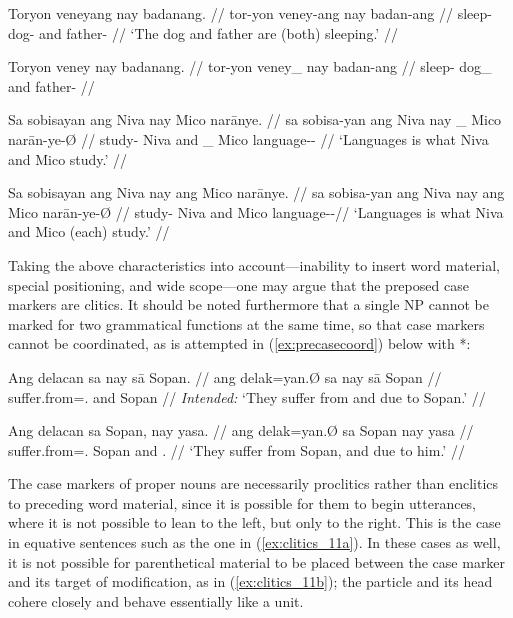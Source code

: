 \pex\label{ex:clitics_7}
\a\label{ex:clitics_7a}\begingl
	\gla Toryon veneyang nay badanang. //
	\glb tor-yon veney-ang nay badan-ang //
	\glc sleep-\TplN{} dog-\Aarg{} and father-\Aarg{} //
	\glft `The dog and father are (both) sleeping.' //
\endgl

\a\label{ex:clitics_7b}\ljudge{*}\begingl
	\gla Toryon veney nay badanang. //
	\glb tor-yon veney\_ nay badan-ang //
	\glc sleep-\TplN{} dog\_ and father-\Aarg{} //
\endgl

\a\label{ex:clitics_7c}\begingl
	\gla Sa sobisayan ang Niva nay {} Mico narānye. //
	\glb sa sobisa-yan ang Niva nay \_ Mico narān-ye-Ø //
	\glc \PatT{} study-\TplM{} \Aarg{} Niva and \_ Mico 
		language-\Pl{}-\Top{} //
	\glft `Languages is what Niva and Mico study.' //
\endgl

\a\label{ex:clitics_7d}\begingl
	\gla Sa sobisayan ang Niva nay ang Mico narānye. //
	\glb sa sobisa-yan ang Niva nay ang Mico narān-ye-Ø //
	\glc \PatT{} study-\TplM{} \Aarg{} Niva and \Aarg{} Mico 
		language-\Pl{}-\Top{}//
	\glft `Languages is what Niva and Mico (each) study.' //
\endgl
\xe


Taking the above characteristics into account---inability to insert word
material, special positioning, and wide scope---one may argue that the preposed
case markers are clitics. It should be noted furthermore that a single NP
cannot be marked for two grammatical functions at the same time, so that case
markers cannot be coordinated, as is attempted in (\ref{ex:precasecoord}) below 
with *:

\pex
\a\label{ex:precasecoord}\ljudge*\begingl
	\gla Ang delacan sa nay sā Sopan. //
	\glb ang delak=yan.Ø sa nay sā Sopan //
	\glc \AgtT{} suffer.from=\TplM{}.\Top{} \Parg{} and \Caus{} Sopan //
	\glft \textit{Intended:} `They suffer from and due to Sopan.' //
\endgl

\a\begingl
	\gla Ang delacan sa Sopan, nay yasa. //
	\glb ang delak=yan.Ø sa Sopan nay yasa //
	\glc \AgtT{} suffer.from=\TplM{}.\Top{} \Parg{} Sopan and \TsgM{}.\Caus{} //
	\glft `They suffer from Sopan, and due to him.' //
	\endgl
\xe

The case markers of proper nouns are necessarily proclitics rather than
enclitics to preceding word material, since it is possible for them to begin
utterances, where it is not possible to lean to the left, but only to the 
right. This is the case in equative sentences such as the one in 
(\ref{ex:clitics_11a}). In these cases as well, it is not possible for
parenthetical material to be placed between the case marker and its target of
modification, as in (\ref{ex:clitics_11b}); the particle and its head cohere
closely and behave essentially like a unit.

